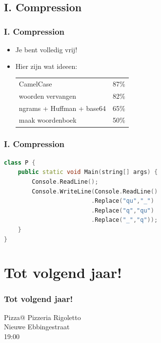 \documentclass[14pt]{beamer}
\begin{document}
\subsection{I. Compression}
\begin{frame}
  \frametitle{I. Compression}
    \large
    \begin{itemize}
      \vspace*{-2mm}
      \item Je bent volledig vrij!
      \vspace*{5mm}
      \item Hier zijn wat ideeen:
            \begin{tabular}{ll}
            CamelCase                 & 87\% \\
            woorden vervangen         & 82\% \\
            ngrams + Huffman + base64 & 65\% \\
            maak woordenboek          & 50\% \\
            \end{tabular}
    \end{itemize}
\end{frame}
\begin{frame}[fragile]
  \frametitle{I. Compression}
  \footnotesize
\begin{lstlisting}[language=C++]
class P {
    public static void Main(string[] args) {
        Console.ReadLine();
        Console.WriteLine(Console.ReadLine()
                         .Replace("qu","_")
                         .Replace("q","qu")
                         .Replace("_","q"));
    }
}
\end{lstlisting}
\end{frame}



\section{Tot volgend jaar!}

\begin{frame}
  \frametitle{Tot volgend jaar!}
  \begin{block}{Pizza@}
    Pizzeria Rigoletto\\
    Nieuwe Ebbingestraat\\
    19:00
  \end{block}
\end{frame}
\end{document}
